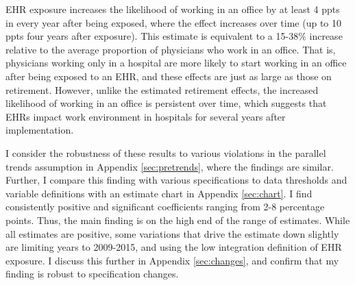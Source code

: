 \documentclass[12pt]{article}
\begin{document}
EHR exposure increases the likelihood of working in an office by at least 4 ppts in every year after being exposed, where the effect increases over time (up to 10 ppts four years after exposure). This estimate is equivalent to a 15-38\% increase relative to the average proportion of physicians who work in an office. That is, physicians working only in a hospital are more likely to start working in an office after being exposed to an EHR, and these effects are just as large as those on retirement. However, unlike the estimated retirement effects, the increased likelihood of working in an office is persistent over time, which suggests that EHRs impact work environment in hospitals for several years after implementation. 

I consider the robustness of these results to various violations in the parallel trends assumption in Appendix \ref{sec:pretrends}, where the findings are similar. Further, I compare this finding with various specifications to data thresholds and variable definitions with an estimate chart in Appendix \ref{sec:chart}. I find consistently positive and significant coefficients ranging from 2-8 percentage points. Thus, the main finding is on the high end of the range of estimates. While all estimates are positive, some variations that drive the estimate down slightly are limiting years to 2009-2015, and using the low integration definition of EHR exposure. I discuss this further in Appendix \ref{sec:changes}, and confirm that my finding is robust to specification changes. 
\end{document}
